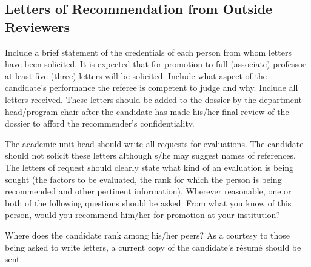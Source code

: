 \subsection*{Letters of Recommendation from Outside Reviewers}
Include a brief statement of the credentials of each person from whom letters have been solicited. It is expected that for promotion to full (associate) professor at least five (three) letters will be solicited. Include what aspect of the candidate’s performance the referee is competent to judge and why. Include all letters received. These letters should be added to the dossier by the department head/program chair after the candidate has made his/her final review of the dossier to afford the recommender’s confidentiality.

The academic unit head should write all requests for evaluations. The candidate should not solicit these letters although s/he may suggest names of references. The letters of request should clearly state what kind of an evaluation is being sought (the factors to be evaluated, the rank for which the person is being recommended and other pertinent information). Wherever reasonable, one or both of the following questions should be asked. From what you know of this person, would you recommend him/her for promotion at your institution?

Where does the candidate rank among his/her peers? As a courtesy to those being asked to write letters, a current copy of the candidate’s résumé should be sent.





